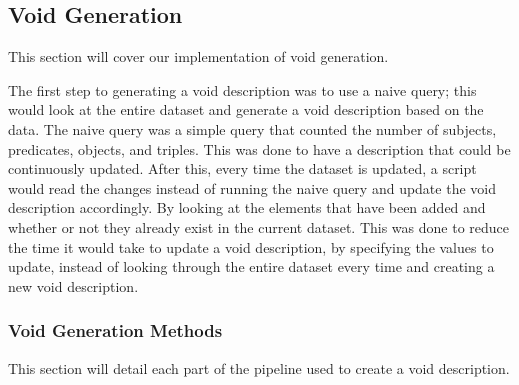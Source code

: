 \subsection{Void Generation}\label{sec:void}
This section will cover our implementation of void generation.

The first step to generating a \gls{void} description was to use a naive query; this would look at the entire dataset and generate a \gls{void} description based on the data. The naive query was a simple query that counted the number of subjects, predicates, objects, and triples. This was done to have a description that could be continuously updated. After this, every time the dataset is updated, a script would read the changes instead of running the naive query and update the \gls{void} description accordingly. By looking at the elements that have been added and whether or not they already exist in the current dataset. This was done to reduce the time it would take to update a \gls{void} description, by specifying the values to update, instead of looking through the entire dataset every time and creating a new \gls{void} description.

\subsubsection{Void Generation Methods}\label{sec:voidmethods}
This section will detail each part of the pipeline used to create a void description.



